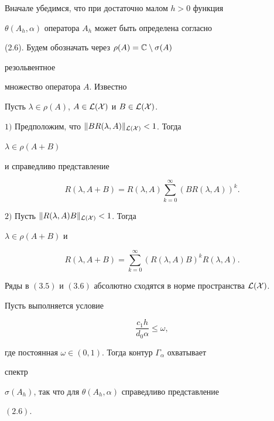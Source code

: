  


Вначале убедимся, что при достаточно малом $h>0$ функция 


$\theta(A_h,\alpha)$ оператора $A_h$ может быть определена согласно 


(2.6). Будем обозначать через $\rho(A)=\Bbb C\setminus\sigma(A)$ 


резольвентное 


множество оператора $A$. Известно 


 


\begin{prop} Пусть $\lambda\in\rho(A)$, $A\in\cal L(X)$ и $B\in\cal L(X)$. 


 


$1)$ Предположим, что $\|B R(\lambda,A)\|_{\cal L(X)}<1$. Тогда 


$\lambda\in\rho(A+B)$ 


и справедливо представление 


\begin{equation} 


R(\lambda,A+B)=R(\lambda,A)\sum^\infty_{k=0} 


(B R(\lambda,A))^k. 


\end{equation} 


 


$2)$ Пусть $\|R(\lambda,A)B\|_{\cal L(X)}<1$. Тогда 


$\lambda\in\rho(A+B)$ и 


\begin{equation} 


R(\lambda,A+B)=\sum^\infty_{k=0}(R(\lambda,A)B)^k R(\lambda,A). 


\end{equation} 


Ряды в $(3.5)$ и $(3.6)$ абсолютно сходятся в норме пространства $\cal 


L(X)$. 


\end{prop} 


 


\begin{lemnonum} 


Пусть выполняется условие 


\begin{equation} 


\frac{c_1h}{d_0\alpha}\le\omega, 


\end{equation} 


где постоянная $\omega\in(0,1)$. Тогда контур $\Gamma_\alpha$ охватывает 


спектр 


$\sigma(A_h)$, так что для $\theta(A_h,\alpha)$ справедливо представление 


$(2.6)$. 


\end{lemnonum} 


